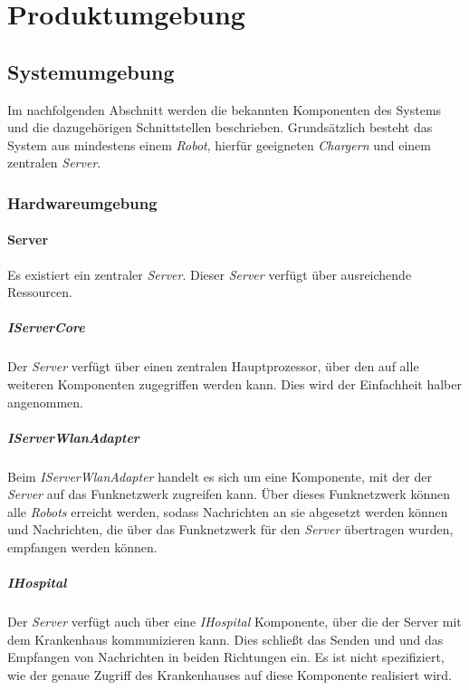 \section{Produktumgebung}

  \subsection{Systemumgebung}
  Im nachfolgenden Abschnitt werden die bekannten Komponenten des Systems
  und die dazugehörigen Schnittstellen beschrieben. Grundsätzlich besteht
  das System aus mindestens einem \emph{Robot}, hierfür geeigneten
  \emph{Chargern} und einem zentralen \emph{Server}.

    \subsubsection{Hardwareumgebung}
    \paragraph{Server}\label{server}

    Es existiert ein zentraler \emph{Server}. Dieser \emph{Server} verfügt
    über ausreichende Ressourcen.

    \subparagraph{IServerCore}\label{iservercore}

    Der \emph{Server} verfügt über einen zentralen Hauptprozessor, über den
    auf alle weiteren Komponenten zugegriffen werden kann. Dies wird der
    Einfachheit halber angenommen.

    \subparagraph{IServerWlanAdapter}\label{iserverwlanadapter}

    Beim \emph{IServerWlanAdapter} handelt es sich um eine Komponente, mit der der \emph{Server}
    auf das Funknetzwerk zugreifen kann. Über dieses Funknetzwerk können alle
    \emph{Robots} erreicht werden, sodass Nachrichten an sie abgesetzt werden können
    und Nachrichten, die über das Funknetzwerk für den \emph{Server} übertragen wurden,
    empfangen werden können.

    \subparagraph{IHospital}\label{ihospital}

    Der \emph{Server} verfügt auch über eine \emph{IHospital} Komponente, über die
    der Server mit dem Krankenhaus kommunizieren kann. Dies schließt das Senden und
    und das Empfangen von Nachrichten in beiden Richtungen ein. Es ist nicht spezifiziert,
    wie der genaue Zugriff des Krankenhauses auf diese Komponente realisiert wird.

